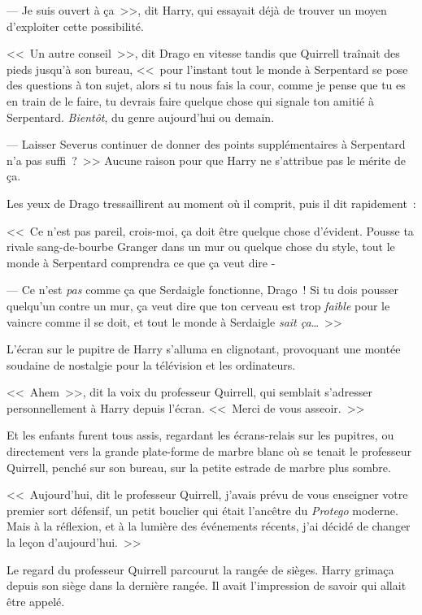 --- Je suis ouvert à ça~>>, dit Harry, qui essayait déjà de trouver un moyen d'exploiter cette possibilité.

<<~Un autre conseil~>>, dit Drago en vitesse tandis que Quirrell traînait des pieds jusqu'à son bureau, <<~pour l'instant tout le monde à Serpentard se pose des questions à ton sujet, alors si tu nous fais la cour, comme je pense que tu es en train de le faire, tu devrais faire quelque chose qui signale ton amitié à Serpentard. \emph{Bientôt}, du genre aujourd'hui ou demain.

--- Laisser Severus continuer de donner des points supplémentaires à Serpentard n'a pas suffi~?~>> Aucune raison pour que Harry ne s'attribue pas le mérite de ça.

Les yeux de Drago tressaillirent au moment où il comprit, puis il dit rapidement~:

<<~Ce n'est pas pareil, crois-moi, ça doit être quelque chose d'évident. Pousse ta rivale sang-de-bourbe Granger dans un mur ou quelque chose du style, tout le monde à Serpentard comprendra ce que ça veut dire -

--- Ce n'est \emph{pas} comme ça que Serdaigle fonctionne, Drago~! Si tu dois pousser quelqu'un contre un mur, ça veut dire que ton cerveau est trop \emph{faible} pour le vaincre comme il se doit, et tout le monde à Serdaigle \emph{sait ça}…~>>

L'écran sur le pupitre de Harry s'alluma en clignotant, provoquant une montée soudaine de nostalgie pour la télévision et les ordinateurs.

<<~Ahem~>>, dit la voix du professeur Quirrell, qui semblait s'adresser personnellement à Harry depuis l'écran. <<~Merci de vous asseoir.~>>

\later

Et les enfants furent tous assis, regardant les écrans-relais sur les pupitres, ou directement vers la grande plate-forme de marbre blanc où se tenait le professeur Quirrell, penché sur son bureau, sur la petite estrade de marbre plus sombre.

<<~Aujourd'hui, dit le professeur Quirrell, j'avais prévu de vous enseigner votre premier sort défensif, un petit bouclier qui était l'ancêtre du \emph{Protego} moderne. Mais à la réflexion, et à la lumière des événements récents, j'ai décidé de changer la leçon d'aujourd'hui.~>>

Le regard du professeur Quirrell parcourut la rangée de sièges. Harry grimaça depuis son siège dans la dernière rangée. Il avait l'impression de savoir qui allait être appelé.

